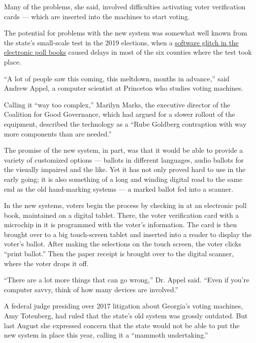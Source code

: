 Many of the problems, she said, involved difficulties activating voter
verification cards --- which are inserted into the machines to start
voting.

The potential for problems with the new system was somewhat well known
from the state's small-scale test in the 2019 elections, when a
\href{https://www.ajc.com/news/state--regional-govt--politics/problem-with-new-election-equipment-delays-voting-georgia-counties/vxltEshk0grck0uJiWA5RM/}{software
glitch in the electronic poll books} caused delays in most of the six
counties where the test took place.

``A lot of people saw this coming, this meltdown, months in advance,''
said Andrew Appel, a computer scientist at Princeton who studies voting
machines.

Calling it ``way too complex,'' Marilyn Marks, the executive director of
the Coalition for Good Governance, which had argued for a slower rollout
of the equipment, described the technology as a ``Rube Goldberg
contraption with way more components than are needed.''

The promise of the new system, in part, was that it would be able to
provide a variety of customized options --- ballots in different
languages, audio ballots for the visually impaired and the like. Yet it
has not only proved hard to use in the early going; it is also something
of a long and winding digital road to the same end as the old
hand-marking systems --- a marked ballot fed into a scanner.

In the new systems, voters begin the process by checking in at an
electronic poll book, maintained on a digital tablet. There, the voter
verification card with a microchip in it is programmed with the voter's
information. The card is then brought over to a big touch-screen tablet
and inserted into a reader to display the voter's ballot. After making
the selections on the touch screen, the voter clicks ``print ballot.''
Then the paper receipt is brought over to the digital scanner, where the
voter drops it off.

``There are a lot more things that can go wrong,'' Dr. Appel said.
``Even if you're computer savvy, think of how many devices are
involved.''

A federal judge presiding over 2017 litigation about Georgia's voting
machines, Amy Totenberg, had ruled that the state's old system was
grossly outdated. But last August she expressed concern that the state
would not be able to put the new system in place this year, calling it a
``mammoth undertaking.''

